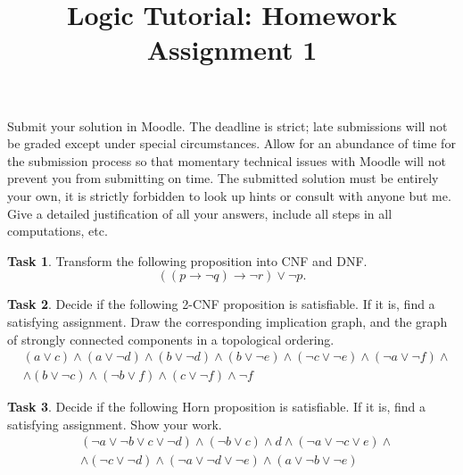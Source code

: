 \documentclass[a4paper]{amsart}
\title{\sc Logic Tutorial: Homework Assignment 1}
\theoremstyle{definition}
\newtheorem{task}{Task}
\begin{document}
\maketitle

\thispagestyle{empty}

Submit your solution in Moodle. The deadline is strict; late submissions will not be graded except under special circumstances. Allow for an abundance of time for the submission process so that momentary technical issues with Moodle will not prevent you from submitting on time. The submitted solution must be entirely your own, it is strictly forbidden to look up hints or consult with anyone but me. Give a detailed justification of all your answers, include all steps in all computations, etc.


\begin{task}
Transform the following proposition into CNF and DNF. 
$$
((p\to \neg q) \to \neg r) \vee \neg p.
$$
\end{task}

\begin{task}
Decide if the following 2-CNF proposition is satisfiable. If it is, find a satisfying assignment. Draw the corresponding implication graph, and the graph of strongly connected components in a topological ordering.
\begin{align*}
&(a \vee  c) \wedge  (a \vee  \neg d) \wedge  (b \vee  \neg d) 
\wedge  (b \vee  \neg e) \wedge  (\neg c \vee  \neg e) 
\wedge  (\neg a \vee  \neg f)
\wedge \\ &\wedge (b\vee\neg c)\wedge
(\neg b \vee  f) \wedge  (c \vee  \neg f) \wedge \neg f
\end{align*}
\end{task}

\begin{task}
Decide if the following Horn proposition is satisfiable. If it is, find a satisfying assignment. Show your work.
\begin{align*}
&(\neg a \vee \neg b \vee c \vee \neg d)\wedge(\neg b \vee c)\wedge d \wedge (\neg a \vee \neg c \vee e)\wedge \\
&\wedge(\neg c \vee \neg d)\wedge(\neg a \vee \neg d \vee \neg e)\wedge(a\vee \neg b \vee\neg e)
\end{align*}
\end{task}
\end{document}
